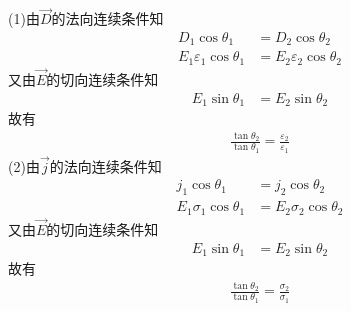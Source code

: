 \documentclass{phyasgn}
\begin{document}
\begin{sol}[4]
    (1)由$\vec{D}$的法向连续条件知
    \begin{align*}
        D_1\cos\theta_1&=D_2\cos\theta_2\\
        E_1\varepsilon_1\cos\theta_1&=E_2\varepsilon_2\cos\theta_2
    \end{align*}
    又由$\vec{E}$的切向连续条件知
    \begin{align*}
        E_1\sin\theta_1&=E_2\sin\theta_2
    \end{align*}
    故有
    \begin{align*}
        \frac{\tan\theta_2}{\tan\theta_1}=\frac{\varepsilon_2}{\varepsilon_1}
    \end{align*}
    (2)由$\vec{j}$的法向连续条件知
    \begin{align*}
        j_1\cos\theta_1&=j_2\cos\theta_2\\
        E_1\sigma_1\cos\theta_1&=E_2\sigma_2\cos\theta_2
    \end{align*}
    又由$\vec{E}$的切向连续条件知
    \begin{align*}
        E_1\sin\theta_1&=E_2\sin\theta_2
    \end{align*}
    故有
    \begin{align*}
        \frac{\tan\theta_2}{\tan\theta_1}=\frac{\sigma_2}{\sigma_1}
    \end{align*}
\end{sol}\par
\end{document}
